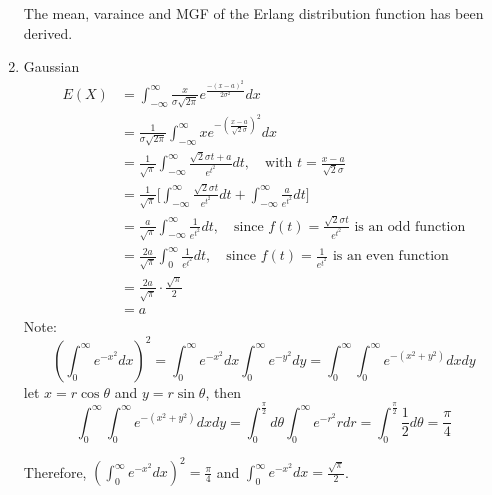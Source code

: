 \documentclass[UTF8]{article}
\begin{document}
\begin{enumerate}
            The mean, varaince and MGF of the Erlang distribution function has been derived.
            \item Gaussian
            \begin{equation*}
                \begin{split}
                    E(X) &= \int_{-\infty}^\infty\frac{x}{\sigma\sqrt{2\pi}}e^{\frac{-(x-a)^2}{2\sigma^2}}dx\\
                    &=\frac{1}{\sigma\sqrt{2\pi}}\int^\infty_{-\infty}xe^{-(\frac{x-a}{\sqrt{2}\sigma})^2}dx \\
                    &=\frac{1}{\sqrt{\pi}}\int^\infty_{-\infty}\frac{\sqrt{2}\sigma t+a}{e^{t^2}}dt,\quad\text{with $t=\frac{x-a}{\sqrt{2}\sigma}$}\\
                    &=\frac{1}{\sqrt{\pi}}\bigg[\int^\infty_{-\infty}\frac{\sqrt{2}\sigma t}{e^{t^2}}dt+\int^\infty_{-\infty}\frac{a}{e^{t^2}}dt\bigg]\\
                    &=\frac{a}{\sqrt{\pi}}\int^\infty_{-\infty}\frac{1}{e^{t^2}}dt,\quad\text{since $f(t)=\frac{\sqrt{2}\sigma t}{e^{t^2}}$ is an odd function}\\
                    &=\frac{2a}{\sqrt{\pi}}\int^\infty_0\frac{1}{e^{t^2}}dt,\quad\text{since $f(t)=\frac{1}{e^{t^2}}$ is an even function}\\
                    &=\frac{2a}{\sqrt{\pi}}\cdot\frac{\sqrt{\pi}}{2}\\
                    &=a
                \end{split}
            \end{equation*}
            Note:
            \begin{equation*}
                (\int^\infty_0e^{-x^2}dx)^2=\int^\infty_0e^{-x^2}dx\int^\infty_0e^{-y^2}dy=\int^\infty_0\int^\infty_0e^{-(x^2+y^2)}dxdy
            \end{equation*}
            let $x=r\cos\theta$ and $y=r\sin\theta$, then
            \begin{equation*}
                \int^\infty_0\int^\infty_0e^{-(x^2+y^2)}dxdy=\int^{\frac{\pi}{2}}_0d\theta\int^\infty_0e^{-r^2}rdr=\int^{\frac{\pi}{2}}_0\frac{1}{2}d\theta=\frac{\pi}{4}
            \end{equation*}
            
            Therefore, $(\int^\infty_0e^{-x^2}dx)^2=\frac{\pi}{4}$ and $\int^\infty_0e^{-x^2}dx=\frac{\sqrt{\pi}}{2}$.


\end{enumerate}
\end{document}
